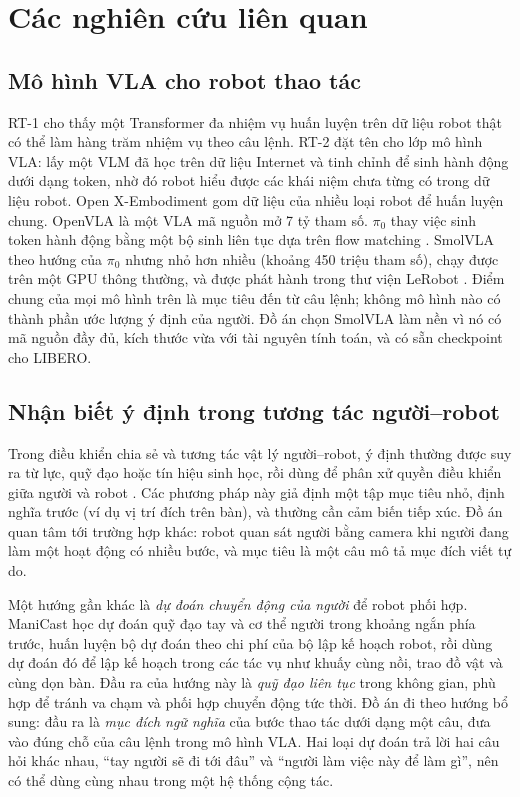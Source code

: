 \documentclass[a4paper,oneside]{report}
\begin{document}
\section{Các nghiên cứu liên quan}
\label{sec:related}

\subsection{Mô hình VLA cho robot thao tác}

RT-1 \citep{brohan2022rt1} cho thấy một Transformer đa nhiệm vụ huấn luyện trên dữ liệu robot thật có thể làm hàng trăm nhiệm vụ theo câu lệnh. RT-2 \citep{zitkovich2023rt2} đặt tên cho lớp mô hình VLA: lấy một VLM đã học trên dữ liệu Internet và tinh chỉnh để sinh hành động dưới dạng token, nhờ đó robot hiểu được các khái niệm chưa từng có trong dữ liệu robot. Open X-Embodiment \citep{openx2024} gom dữ liệu của nhiều loại robot để huấn luyện chung. OpenVLA \citep{kim2024openvla} là một VLA mã nguồn mở 7 tỷ tham số. $\pi_0$ \citep{black2024pi0} thay việc sinh token hành động bằng một bộ sinh liên tục dựa trên flow matching \citep{lipman2023flow}. SmolVLA \citep{shukor2025smolvla} theo hướng của $\pi_0$ nhưng nhỏ hơn nhiều (khoảng 450 triệu tham số), chạy được trên một GPU thông thường, và được phát hành trong thư viện LeRobot \citep{cadene2026lerobot}. Điểm chung của mọi mô hình trên là mục tiêu đến từ câu lệnh; không mô hình nào có thành phần ước lượng ý định của người. Đồ án chọn SmolVLA làm nền vì nó có mã nguồn đầy đủ, kích thước vừa với tài nguyên tính toán, và có sẵn checkpoint cho LIBERO.

\subsection{Nhận biết ý định trong tương tác người--robot}

Trong điều khiển chia sẻ và tương tác vật lý người--robot, ý định thường được suy ra từ lực, quỹ đạo hoặc tín hiệu sinh học, rồi dùng để phân xử quyền điều khiển giữa người và robot \citep{losey2018review}. Các phương pháp này giả định một tập mục tiêu nhỏ, định nghĩa trước (ví dụ vị trí đích trên bàn), và thường cần cảm biến tiếp xúc. Đồ án quan tâm tới trường hợp khác: robot quan sát người bằng camera khi người đang làm một hoạt động có nhiều bước, và mục tiêu là một câu mô tả mục đích viết tự do.

Một hướng gần khác là \textit{dự đoán chuyển động của người} để robot phối hợp. ManiCast \citep{kedia2023manicast} học dự đoán quỹ đạo tay và cơ thể người trong khoảng ngắn phía trước, huấn luyện bộ dự đoán theo chi phí của bộ lập kế hoạch robot, rồi dùng dự đoán đó để lập kế hoạch trong các tác vụ như khuấy cùng nồi, trao đồ vật và cùng dọn bàn. Đầu ra của hướng này là \textit{quỹ đạo liên tục} trong không gian, phù hợp để tránh va chạm và phối hợp chuyển động tức thời. Đồ án đi theo hướng bổ sung: đầu ra là \textit{mục đích ngữ nghĩa} của bước thao tác dưới dạng một câu, đưa vào đúng chỗ của câu lệnh trong mô hình VLA. Hai loại dự đoán trả lời hai câu hỏi khác nhau, ``tay người sẽ đi tới đâu'' và ``người làm việc này để làm gì'', nên có thể dùng cùng nhau trong một hệ thống cộng tác.
\end{document}
